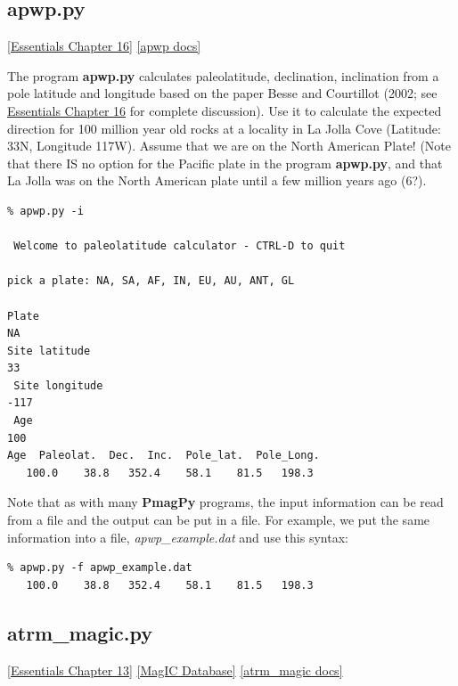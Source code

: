 \documentclass[11pt]{book}
\begin{document}
{

\subsection{apwp.py }
\href{http://earthref.org/MAGIC/books/Tauxe/Essentials/WebBook3ch16.html#ch16}{[Essentials Chapter 16]}
\href{https://github.com/PmagPy/PmagPy/blob/master/programs/apwp.py}{[apwp docs]}

The program {\bf apwp.py} calculates paleolatitude, declination, inclination from  a pole latitude and longitude based on  the paper Besse and Courtillot (2002; see  \href{http://earthref.org/MAGIC/books/Tauxe/Essentials/WebBook3ch16.html#apparent_polar_wander_path}{Essentials Chapter 16} for complete discussion).  \nocite{besse02}
Use it  to calculate the expected direction for 100 million year old rocks at a locality in La Jolla Cove (Latitude: 33N, Longitude 117W).    Assume that we are on the North American Plate!  (Note that there IS no option for the Pacific plate in the program {\bf apwp.py}, and that La Jolla was on the North American plate until a few million years ago (6?).

\begin{verbatim}
% apwp.py -i

 Welcome to paleolatitude calculator - CTRL-D to quit

pick a plate: NA, SA, AF, IN, EU, AU, ANT, GL

Plate
NA
Site latitude
33
 Site longitude
-117
 Age
100
Age  Paleolat.  Dec.  Inc.  Pole_lat.  Pole_Long.
   100.0    38.8   352.4    58.1    81.5   198.3

\end{verbatim}

Note that as with many {\bf PmagPy}  programs, the input information can be read from a file and the output can be put in a file.   For example, we put the same information into a file, {\it apwp\_example.dat} and use this syntax:

\begin{verbatim}
% apwp.py -f apwp_example.dat
   100.0    38.8   352.4    58.1    81.5   198.3
\end{verbatim}


\subsection{atrm\_magic.py}
{ \href{http://earthref.org/MAGIC/books/Tauxe/Essentials/WebBook3ch13.html#ch13}{[Essentials Chapter 13]}
\href{#MagICDatabase}{[MagIC Database]}
\href{https://github.com/PmagPy/PmagPy/blob/master/programs/atrm_magic.py}{[atrm\_magic docs]}

}}
\end{document}
